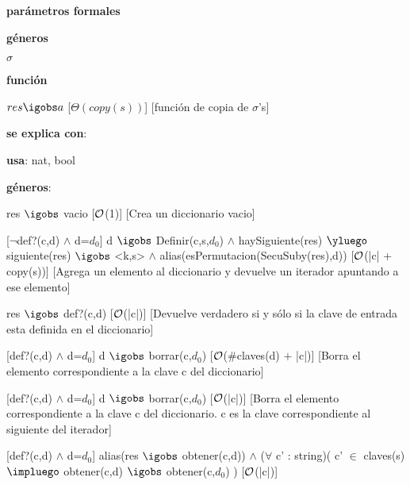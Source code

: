 \begin{Interfaz}

	\textbf{parámetros formales}\parindent\\
	\parbox{1.7cm}{\textbf{géneros}} $\sigma$\\
	\parbox[t]{1.7cm}{\textbf{función}}\parbox[t]{\textwidth-2\parindent-1.7cm}{%
	    	{$res \igobs a$}
		[$\Theta(copy(s))$]
		[función de copia de $\sigma$'s]
	}
	
	\textbf{se explica con}: 
	
	\textbf{usa}: nat, bool
	
	\textbf{géneros}: 
	
	
	{res $\igobs$ vacio}
	[$\mathcal{O}$(1)]
	[Crea un diccionario vacio]
	
	[$\neg$def?(c,d) $\land$ d=$d_0$]
	{d $\igobs$ Definir(c,s,$d_0$) $\land$ haySiguiente(res) $\yluego$ siguiente(res) $\igobs$ <k,s> $\land$ alias(esPermutacion(SecuSuby(res),d))}
	[$\mathcal{O}$(|c| + copy(s))]
	[Agrega un elemento al diccionario y devuelve un iterador apuntando a ese elemento]	
	
	{res $\igobs$ def?(c,d)}
	[$\mathcal{O}$(|c|)]
	[Devuelve verdadero si y sólo si la clave de entrada esta definida en el diccionario]	
	
	[def?(c,d) $\land$ d=$d_0$]
	{d $\igobs$ borrar(c,$d_0$)}
	[$\mathcal{O}$($\#$claves(d) $+$ |c|)]
	[Borra el elemento correspondiente a la clave c del diccionario]
	
	[def?(c,d) $\land$ d=$d_0$]
	{d $\igobs$ borrar(c,$d_0$)}
	[$\mathcal{O}$(|c|)]
	[Borra el elemento correspondiente a la clave c del diccionario. c es la clave correspondiente al siguiente del iterador]
	
	[def?(c,d) $\land$ d=$d_0$]
	{alias(res $\igobs$ obtener(c,d)) $\land$ ($\forall$ c' : string)( c' $\in$ claves(s) $\impluego$ obtener(c,d) $\igobs$ obtener(c,$d_0$) )}
	[$\mathcal{O}$(|c|)]
	
\end{Interfaz}

